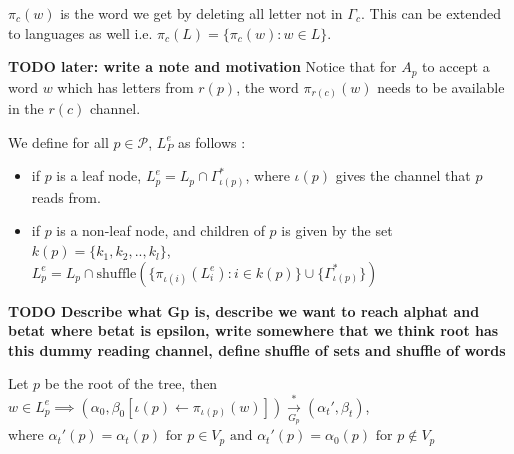 \documentclass[a4paper,UKenglish,cleveref, autoref, thm-restate]{lipics-v2019}
\begin{document}
\hspace*{1cm}$\pi_c(w)$ is the word we get by deleting all letter not in $\Gamma_c$. This can be extended to languages as well i.e. $\pi_c(L) = \{ \pi_c(w) : w \in L\}$.

\textbf{TODO later: write a note and motivation }Notice that for $A_p$ to accept a word $w$ which has letters from $r(p)$, the word $\pi_{r(c)}(w)$ needs to be available in the $r(c)$ channel.

We define for all $p \in \mathcal{P}$, $L_P^e$ as follows : 
\begin{itemize}
    \item if $p$ is a leaf node, $L_p^e = L_p \cap \Gamma_{\iota(p)}^*$, where $\iota(p)$ gives the channel that $p$ reads from.
    \item if $p$ is a non-leaf node, and children of $p$ is given by the set $k(p) = \{k_1, k_2, .., k_l\}$, $L_p^e = L_p \cap \text{shuffle}(\{ \pi_{\iota(i)}(L_i^e)  : i \in k(p)\} \cup \{\Gamma_{\iota(p)}^*\})$
\end{itemize}
    
\textbf{TODO Describe what Gp is, describe we want to reach alphat and betat where betat is epsilon, write somewhere that we think root has this dummy reading channel, define shuffle of sets and shuffle of words}


\begin{lemma}\label{testenv-lemma}

Let $p$ be the root of the tree, then \\
\hspace*{2cm}$w \in L_p^e \implies (\alpha_0, \beta_0[\iota(p) \leftarrow \pi_{\iota(p)}(w) ]) \xrightarrow[G_p]{*} (\alpha_t', \beta_t)$, \\
where $\alpha_t'(p) = \alpha_t(p) \text{ for } p \in V_p  \text{ and } \alpha_t'(p) = \alpha_0(p) \text{ for } p \notin V_p$
\end{lemma}
   
\end{document}
